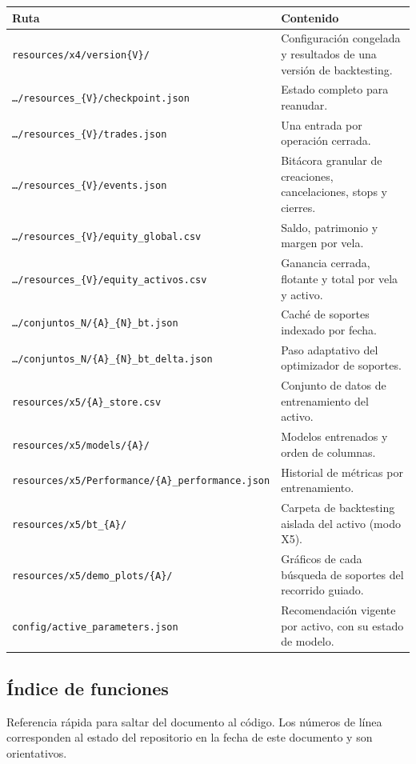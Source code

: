 \documentclass[11pt,a4paper]{article}
\newcommand{\code}[1]{\texttt{\small #1}}
\begin{document}
\begin{longtable}{@{}p{6.6cm} p{\dimexpr\linewidth-7.1cm\relax}@{}}
\toprule
\textbf{Ruta} & \textbf{Contenido} \\
\midrule
\endhead
\code{resources/x4/version\{V\}/} & Configuración congelada y resultados de una versión de backtesting. \\
\code{\dots/resources_\{V\}/checkpoint.json} & Estado completo para reanudar. \\
\code{\dots/resources_\{V\}/trades.json} & Una entrada por operación cerrada. \\
\code{\dots/resources_\{V\}/events.json} & Bitácora granular de creaciones, cancelaciones, stops y cierres. \\
\code{\dots/resources_\{V\}/equity_global.csv} & Saldo, patrimonio y margen por vela. \\
\code{\dots/resources_\{V\}/equity_activos.csv} & Ganancia cerrada, flotante y total por vela y activo. \\
\code{\dots/conjuntos_N/\{A\}_\{N\}_bt.json} & Caché de soportes indexado por fecha. \\
\code{\dots/conjuntos_N/\{A\}_\{N\}_bt_delta.json} & Paso adaptativo del optimizador de soportes. \\
\code{resources/x5/\{A\}_store.csv} & Conjunto de datos de entrenamiento del activo. \\
\code{resources/x5/models/\{A\}/} & Modelos entrenados y orden de columnas. \\
\code{resources/x5/Performance/\{A\}_performance.json} & Historial de métricas por entrenamiento. \\
\code{resources/x5/bt_\{A\}/} & Carpeta de backtesting aislada del activo (modo X5). \\
\code{resources/x5/demo\_plots/\{A\}/} & Gráficos de cada búsqueda de soportes del recorrido guiado. \\
\code{config/active_parameters.json} & Recomendación vigente por activo, con su estado de modelo. \\
\bottomrule
\end{longtable}

\subsection{Índice de funciones}

Referencia rápida para saltar del documento al código. Los números de línea corresponden al
estado del repositorio en la fecha de este documento y son orientativos.
\end{document}
